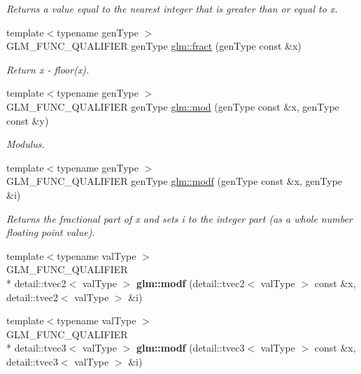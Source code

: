 \begin{DoxyCompactItemize}
\begin{DoxyCompactList}\small\item\em Returns a value equal to the nearest integer that is greater than or equal to x. \end{DoxyCompactList}\item 
{\footnotesize template$<$typename gen\-Type $>$ }\\G\-L\-M\-\_\-\-F\-U\-N\-C\-\_\-\-Q\-U\-A\-L\-I\-F\-I\-E\-R gen\-Type \hyperlink{group__core__func__common_gad5e3814491ff6baa4f0d16aebcabff9b}{glm\-::fract} (gen\-Type const \&x)
\begin{DoxyCompactList}\small\item\em Return x -\/ floor(x). \end{DoxyCompactList}\item 
{\footnotesize template$<$typename gen\-Type $>$ }\\G\-L\-M\-\_\-\-F\-U\-N\-C\-\_\-\-Q\-U\-A\-L\-I\-F\-I\-E\-R gen\-Type \hyperlink{group__core__func__common_ga3bdf136bc96f670965cd2f48d14356b4}{glm\-::mod} (gen\-Type const \&x, gen\-Type const \&y)
\begin{DoxyCompactList}\small\item\em Modulus. \end{DoxyCompactList}\item 
{\footnotesize template$<$typename gen\-Type $>$ }\\G\-L\-M\-\_\-\-F\-U\-N\-C\-\_\-\-Q\-U\-A\-L\-I\-F\-I\-E\-R gen\-Type \hyperlink{group__core__func__common_ga34ff69d5efb2fafa3156ad2b87bd49ec}{glm\-::modf} (gen\-Type const \&x, gen\-Type \&i)
\begin{DoxyCompactList}\small\item\em Returns the fractional part of x and sets i to the integer part (as a whole number floating point value). \end{DoxyCompactList}\item 
\hypertarget{namespaceglm_a543475fad30f0ae13c4953345d2c857e}{{\footnotesize template$<$typename val\-Type $>$ }\\G\-L\-M\-\_\-\-F\-U\-N\-C\-\_\-\-Q\-U\-A\-L\-I\-F\-I\-E\-R \\*
detail\-::tvec2$<$ val\-Type $>$ {\bfseries glm\-::modf} (detail\-::tvec2$<$ val\-Type $>$ const \&x, detail\-::tvec2$<$ val\-Type $>$ \&i)}\label{namespaceglm_a543475fad30f0ae13c4953345d2c857e}

\item 
\hypertarget{namespaceglm_a0d5f8bb5115eaca517b697509de396df}{{\footnotesize template$<$typename val\-Type $>$ }\\G\-L\-M\-\_\-\-F\-U\-N\-C\-\_\-\-Q\-U\-A\-L\-I\-F\-I\-E\-R \\*
detail\-::tvec3$<$ val\-Type $>$ {\bfseries glm\-::modf} (detail\-::tvec3$<$ val\-Type $>$ const \&x, detail\-::tvec3$<$ val\-Type $>$ \&i)}\label{namespaceglm_a0d5f8bb5115eaca517b697509de396df}


\end{DoxyCompactItemize}

